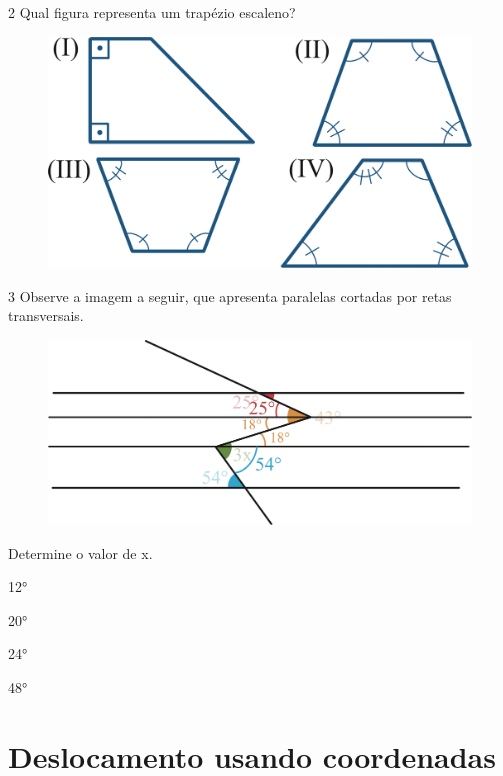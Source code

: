 \num{2} Qual figura representa um trapézio escaleno?

\begin{figure}[htpb!]
\centering
\includegraphics[width=.6\textwidth]{./ilustras-mat/modulo_11-treino_2.png}
\end{figure}

\pagebreak

\num{3} Observe a imagem a seguir, que apresenta paralelas cortadas por retas
transversais.

\begin{figure}[htpb!]
\centering
\includegraphics[width=\textwidth]{./ilustras-mat/modulo_11-treino_3_resposta.png}
\end{figure}

Determine o valor de x.

\begin{escolha}
  \item 12°

  \item 20°

  \item 24°

  \item 48°
\end{escolha}


\chapter{Deslocamento usando coordenadas}

